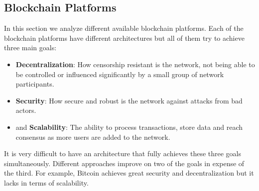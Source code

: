 \pagebreak
\subsection{Blockchain Platforms}
In this section we analyze different available blockchain platforms. Each of the blockchain platforms have different architectures but all of them try to achieve
three main goals:
\begin{itemize}
    \item \textbf{Decentralization}: How censorship resistant is the network, not being able to be controlled or influenced significantly by a small group of network participants.
    \item \textbf{Security}: How secure and robust is the network against attacks from bad actors.
    \item and \textbf{Scalability}: The ability to process transactions, store data and reach consensus as more users are added to the network.
\end{itemize}
It is very difficult to have an architecture that fully achieves these three goals simultaneously. Different approaches improve on two
of the goals in expense of the third. For example, Bitcoin achieves great security and decentralization but it lacks in terms of scalability.


